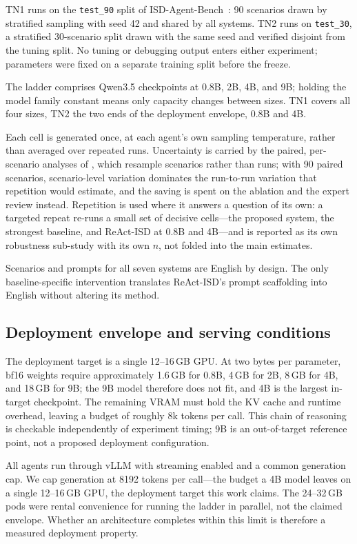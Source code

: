 TN1 runs on the \texttt{test\_90} split of ISD-Agent-Bench~\cite{isdagentbench}: 90
scenarios drawn by stratified sampling with seed 42 and shared by all systems. TN2
runs on \texttt{test\_30}, a stratified 30-scenario split drawn with the same seed
and verified disjoint from the tuning split. No tuning or debugging output enters
either experiment; parameters were fixed on a separate training split before the
freeze.

The ladder comprises Qwen3.5 checkpoints at 0.8B, 2B, 4B, and 9B; holding the model
family constant means only capacity changes between sizes. TN1 covers all four
sizes, TN2 the two ends of the deployment envelope, 0.8B and 4B.

Each cell is generated once, at each agent's own sampling temperature, rather than
averaged over repeated runs. Uncertainty is carried by the paired, per-scenario analyses of
, which resample scenarios rather than runs; with 90 paired
scenarios, scenario-level variation dominates the run-to-run variation that
repetition would estimate, and the saving is spent on the ablation and the expert
review instead. Repetition is used where it answers a question of its own: a
targeted repeat re-runs a small set of decisive cells---the proposed system, the
strongest baseline, and ReAct-ISD at 0.8B and 4B---and is reported as its own
robustness sub-study with its own $n$, not folded into the main estimates.

Scenarios and prompts for all seven systems are English by design. The only
baseline-specific intervention translates ReAct-ISD's prompt scaffolding into
English without altering its method.

\subsection{Deployment envelope and serving conditions}
\label{sec:assumptions}

The deployment target is a single 12--16\,GB GPU. At two bytes per parameter, bf16
weights require approximately 1.6\,GB for 0.8B, 4\,GB for 2B, 8\,GB for 4B, and
18\,GB for 9B; the 9B model therefore does not fit, and 4B is the largest in-target
checkpoint. The remaining VRAM must hold the KV cache and runtime overhead, leaving
a budget of roughly 8k tokens per call. This chain of reasoning is checkable
independently of experiment timing; 9B is an out-of-target reference point, not a
proposed deployment configuration.

All agents run through vLLM with streaming enabled and a common
generation cap. We cap generation at 8192 tokens per call---the budget a 4B model
leaves on a single 12--16\,GB GPU, the deployment target this work claims. The
24--32\,GB pods were rental convenience for running the ladder in parallel, not the
claimed envelope. Whether an architecture completes within this limit is therefore a
measured deployment property.

